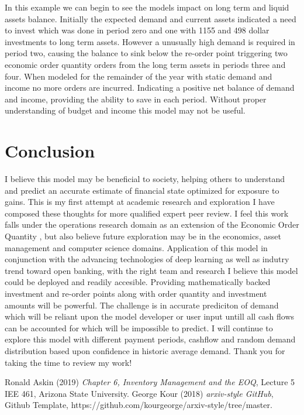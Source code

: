 \documentclass{article}
\begin{document}
In this example we can begin to see the models impact on long term and liquid assets balance. Initially the expected demand and current assets indicated a need to invest which was done in period  zero and one with 1155 and 498 dollar investments to long term assets. However a unusually high demand is required in period two, causing the balance to sink below the re-order point triggering two economic order quantity orders from the long term assets in periods three and four. When modeled for the remainder of the year with static demand and income no more orders are incurred. Indicating a positive net balance of demand and income, providing the ability to save in each period. Without proper understanding of budget and income this model may not be useful. 

\section{Conclusion}
I believe this model may be beneficial to society, helping others to understand and predict an accurate estimate of financial state optimized for exposure to gains. This is my first attempt at academic research and exploration I have composed these thoughts for more qualified expert peer review. I feel this work falls under the operations research domain as an extension of the Economic Order Quantity \cite{Askin2019}, but also believe future exploration may be in the economics, asset management and computer science domains. Application of this model in conjunction with the advancing technologies of deep learning as well as indutry trend toward open banking, with the right team and research I believe this model could be deployed and readily accesible. Providing mathematically backed investment and re-order points along with order quantity and investment amounts will be powerful. The challenge is in accurate prediciton of demand which will be reliant upon the model developer or user input untill all cash flows can be accounted for which will be impossible to predict. I will continue to explore this model with different payment periods, cashflow and random demand distribution based upon confidence in historic average demand.
Thank you for taking the time to review my work! 



 \begin{thebibliography}{1}

 	Ronald Askin (2019) \emph{Chapter 6, Inventory Management and the EOQ}, Lecture 5 IEE 461, Arizona State University.
 	George Kour (2018) \emph{arxiv-style GitHub}, Github Template, https://github.com/kourgeorge/arxiv-style/tree/master.

 \end{thebibliography}
\end{document}
